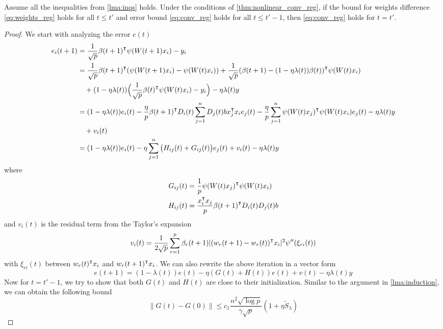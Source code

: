 \begin{lemma}
\label{lma:induction_reg}
Assume all the inequalities from \cref{lma:inqs} holds. Under the conditions of \cref{thm:nonlinear_conv_reg}, if the bound for weights difference \eqref{eq:weights_reg} holds for all $t\leq t'$ and error bound \eqref{eq:conv_reg} holds for all $t\leq t'-1$, then \eqref{eq:conv_reg} holds for $t=t'$.
\end{lemma}
\begin{proof}
We start with analyzing the error $e(t)$
\begin{equation*}
\begin{aligned}
    e_i(t+1) 
    &= \frac{1}{\sqrt p}\beta(t+1)\transpose\psi(W(t+1)x_i) - y_i \\
    &= \frac{1}{\sqrt p}\beta(t+1)\transpose(\psi(W(t+1)x_i)-\psi(W(t)x_i))+ \frac{1}{\sqrt p}(\beta(t+1)-(1-\eta\lambda(t))\beta(t))\transpose \psi(W(t)x_i) \\
    & \quad + (1-\eta\lambda(t))\Big(\frac{1}{\sqrt p}\beta(t)\transpose \psi(W(t)x_i) - y_i\Big) - \eta\lambda(t)y \\
    &=(1-\eta\lambda(t))e_i(t) - \frac{\eta}{p}\beta(t+1)\transpose D_i(t)\sum_{j=1}^nD_j(t)b x_j\transpose x_i e_j(t)  - \frac{\eta}{p}\sum_{j=1}^n\psi(W(t)x_j)\transpose\psi(W(t)x_i)e_j(t) - \eta\lambda(t)y\\
    & \quad + v_i(t) \\
    & = (1-\eta\lambda(t))e_i(t)-\eta\sum_{j=1}^n\big(H_{ij}(t)+G_{ij}(t)\big)e_j(t) + v_i(t) - \eta\lambda(t)y
\end{aligned}
\end{equation*}
where
\begin{equation*}
\begin{aligned}
G_{ij}(t) &= \frac{1}{p}\psi(W(t)x_j)\transpose\psi(W(t)x_i) \\
H_{ij}(t) &= \frac{x_i\transpose x_j}{p}\beta(t+1)\transpose D_i(t)D_j(t)b
\end{aligned}
\end{equation*}
and $v_i(t)$ is the residual term from the Taylor's expansion
\begin{equation*}
    v_i(t) = \frac{1}{2\sqrt p}\sum_{r=1}^p\beta_r(t+1)|(w_r(t+1)-w_r(t))\transpose x_i|^2\psi''(\xi_{ri}(t))
\end{equation*}
with $\xi_{ri}(t)$ between $w_r(t)\transpose x_i$ and $w_r(t+1)\transpose x_i$. We can also rewrite the above iteration in a vector form
\begin{equation}\label{eq:et_iter_reg}
     e(t+1) = (1-\lambda(t))e(t) - \eta(G(t)+H(t))e(t) + v(t) -\eta\lambda(t)y
\end{equation} 
Now for $t=t'-1$, we try to show that both $G(t)$ and $H(t)$ are close to their initialization. Similar to the argument in \cref{lma:induction}, we can obtain the following bound
\begin{equation}\label{eq:bound_Gt_reg}
    \|G(t)-G(0)\| \leq c_1 \frac{n^2\sqrt{\log p}}{\gamma\sqrt p}(1+\eta \tilde{S}_\lambda)
\end{equation}


\end{proof}
